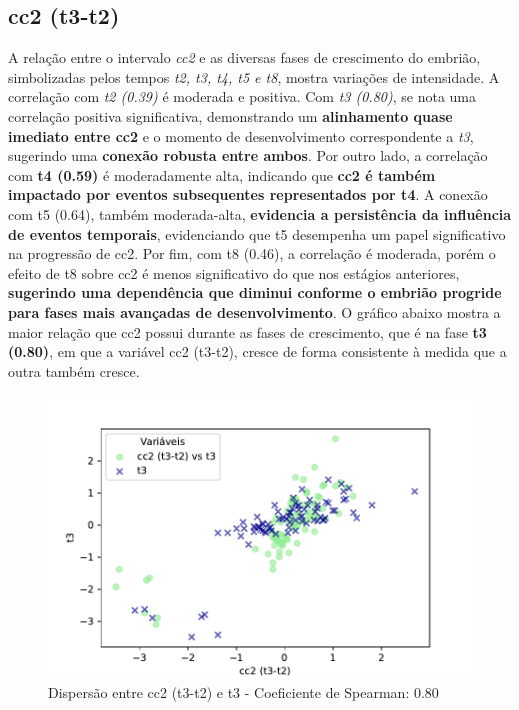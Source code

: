 \subsection*{cc2 (t3-t2)}
A relação entre o intervalo \textit{cc2} e as diversas fases de crescimento do embrião, simbolizadas pelos tempos \textit{t2, t3, t4, t5 e t8}, mostra variações de intensidade. A correlação com \textit{t2 (0.39)} é moderada e positiva. Com \textit{t3 (0.80)}, se nota uma correlação positiva significativa, demonstrando um \textbf{alinhamento quase imediato entre cc2} e o momento de desenvolvimento correspondente a \textit{t3}, sugerindo uma \textbf{conexão robusta entre ambos}. Por outro lado, a correlação com \textbf{t4 (0.59)} é moderadamente alta, indicando que \textbf{cc2 é também impactado por eventos subsequentes representados por t4}. A conexão com t5 (0.64), também moderada-alta, \textbf{evidencia a persistência da influência de eventos temporais}, evidenciando que t5 desempenha um papel significativo na progressão de cc2. Por fim, com t8 (0.46), a correlação é moderada, porém o efeito de t8 sobre cc2 é menos significativo do que nos estágios anteriores, \textbf{sugerindo uma dependência que diminui conforme o embrião progride para fases mais avançadas de desenvolvimento}. O gráfico abaixo mostra a maior relação que cc2 possui durante as fases de crescimento, que é na fase \textbf{t3 (0.80)}, em que a variável cc2 (t3-t2), cresce de forma consistente à medida que a outra também cresce. 

\begin{figure}[h]
    \captionsetup{font=footnotesize, justification=centering, labelsep=period, position=above}
    \caption{Dispersão entre cc2 (t3-t2) e t3 - Coeficiente de Spearman: 0.80}
    \label{fig:cc2-t3}
    \centering
    \includegraphics[scale=0.5]{figuras/Spearman/cc2-t3.pdf}
    \vspace{0.3cm} 
    \begin{minipage}{\linewidth}
        \centering
    \end{minipage}
\end{figure}
\FloatBarrier

